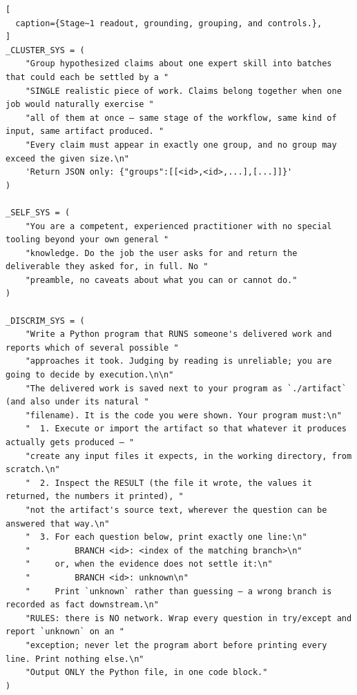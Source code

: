 \begin{lstlisting}[
  caption={Stage~1 readout, grounding, grouping, and controls.},
]
_CLUSTER_SYS = (
    "Group hypothesized claims about one expert skill into batches that could each be settled by a "
    "SINGLE realistic piece of work. Claims belong together when one job would naturally exercise "
    "all of them at once — same stage of the workflow, same kind of input, same artifact produced. "
    "Every claim must appear in exactly one group, and no group may exceed the given size.\n"
    'Return JSON only: {"groups":[[<id>,<id>,...],[...]]}'
)

_SELF_SYS = (
    "You are a competent, experienced practitioner with no special tooling beyond your own general "
    "knowledge. Do the job the user asks for and return the deliverable they asked for, in full. No "
    "preamble, no caveats about what you can or cannot do."
)

_DISCRIM_SYS = (
    "Write a Python program that RUNS someone's delivered work and reports which of several possible "
    "approaches it took. Judging by reading is unreliable; you are going to decide by execution.\n\n"
    "The delivered work is saved next to your program as `./artifact` (and also under its natural "
    "filename). It is the code you were shown. Your program must:\n"
    "  1. Execute or import the artifact so that whatever it produces actually gets produced — "
    "create any input files it expects, in the working directory, from scratch.\n"
    "  2. Inspect the RESULT (the file it wrote, the values it returned, the numbers it printed), "
    "not the artifact's source text, wherever the question can be answered that way.\n"
    "  3. For each question below, print exactly one line:\n"
    "         BRANCH <id>: <index of the matching branch>\n"
    "     or, when the evidence does not settle it:\n"
    "         BRANCH <id>: unknown\n"
    "     Print `unknown` rather than guessing — a wrong branch is recorded as fact downstream.\n"
    "RULES: there is NO network. Wrap every question in try/except and report `unknown` on an "
    "exception; never let the program abort before printing every line. Print nothing else.\n"
    "Output ONLY the Python file, in one code block."
)
\end{lstlisting}

